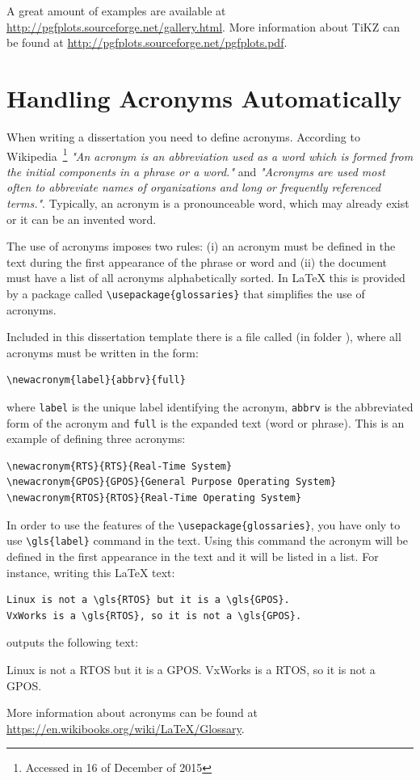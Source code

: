 A great amount of examples are available at \url{http://pgfplots.sourceforge.net/gallery.html}. 
More information about TiKZ can be found at 
\url{http://pgfplots.sourceforge.net/pgfplots.pdf}.


\section{Handling Acronyms Automatically}
When writing a dissertation you need to define acronyms.
According to Wikipedia~\footnote{Accessed in 16 of December of 2015} \textit{"An acronym is an abbreviation used as a word which is formed from the initial components in a phrase or a word."} and
\textit{"Acronyms are used most often to abbreviate names of organizations and long or frequently referenced terms."}.
Typically, an acronym is a pronounceable word, which may already exist or it can be an invented word. 

The use of acronyms imposes two rules: (i) an acronym must be defined in the text during the first appearance of the phrase or word and (ii) the document must have a list of all acronyms alphabetically sorted. In \LaTeX{} this is provided by a package called \verb|\usepackage{glossaries}| that simplifies the use of acronyms. 

Included in this dissertation template there is a file called  (in folder ), where all acronyms must be written in the form:
\begin{verbatim}
\newacronym{label}{abbrv}{full}
\end{verbatim}
where \verb|label| is the unique label identifying the acronym, \verb|abbrv| is the abbreviated form of the acronym and \verb|full| is the expanded text (word or phrase). This is an example of defining three acronyms:
\begin{verbatim}
\newacronym{RTS}{RTS}{Real-Time System}
\newacronym{GPOS}{GPOS}{General Purpose Operating System}
\newacronym{RTOS}{RTOS}{Real-Time Operating System}
\end{verbatim}

In order to use the features of the \verb|\usepackage{glossaries}|, you have only to use \verb|\gls{label}| command in the text. 
Using this command the acronym will be defined in the first appearance in the text and it will be listed in a list.
For instance, writing this \LaTeX{} text:
\begin{verbatim}
Linux is not a \gls{RTOS} but it is a \gls{GPOS}. 
VxWorks is a \gls{RTOS}, so it is not a \gls{GPOS}.
\end{verbatim}

outputs the following text: 

Linux is not a \gls{RTOS} but it is a \gls{GPOS}. VxWorks is a \gls{RTOS}, so it is not a \gls{GPOS}.

More information about acronyms can be found at 
\url{https://en.wikibooks.org/wiki/LaTeX/Glossary}.
